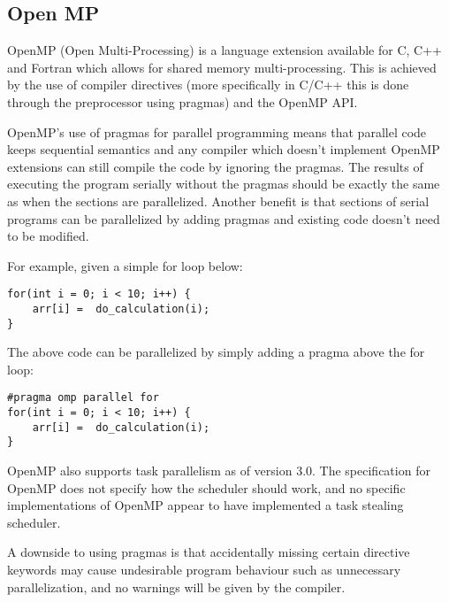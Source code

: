 \subsection{Open MP}

OpenMP (Open Multi-Processing) is a language extension available for C, C++ and Fortran which allows for shared memory multi-processing. 
This is achieved by the use of compiler directives (more specifically in C/C++ this is done through the preprocessor using pragmas) and
the OpenMP API\cite{openmp}.

OpenMP's use of pragmas for parallel programming means that parallel code keeps sequential semantics
and any compiler which doesn't implement OpenMP extensions can still compile the code by ignoring the pragmas.
The results of executing the program serially without the pragmas should be exactly the same as when
the sections are parallelized. Another benefit is that sections of serial programs can be
parallelized by adding pragmas and existing code doesn't need to be modified.

For example, given a simple for loop below:

\begin{lstlisting}[style=myGPC]
for(int i = 0; i < 10; i++) {
    arr[i] =  do_calculation(i);
}
\end{lstlisting}

The above code can be parallelized by simply adding a pragma above
the for loop:

\begin{lstlisting}[style=myGPC] 
#pragma omp parallel for
for(int i = 0; i < 10; i++) {
    arr[i] =  do_calculation(i);
}
\end{lstlisting}

OpenMP also supports task parallelism as of version 3.0\cite{openmp3}. The specification for OpenMP
does not specify how the scheduler should work, and no specific implementations of OpenMP appear to have 
implemented a task stealing scheduler.

A downside to using pragmas is that accidentally missing certain directive keywords may cause undesirable 
program behaviour such as unnecessary parallelization\cite{openmptraps}, and no warnings will be given by the compiler.

 
